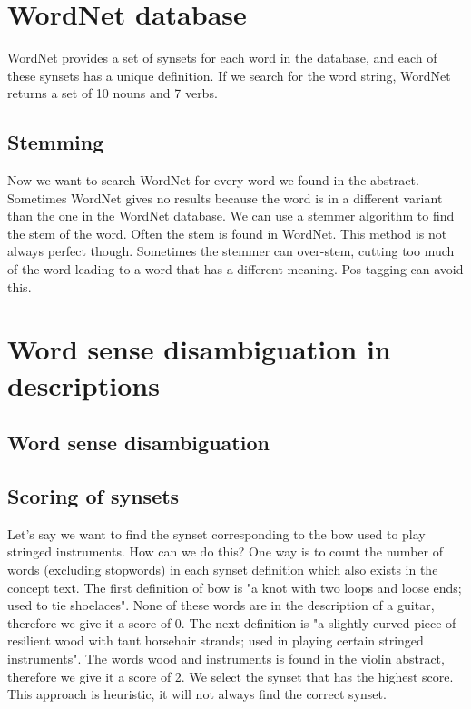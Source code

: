 
\section{WordNet database}
WordNet provides a set of synsets for each word in the database, and each of these synsets has a unique definition. If we search for the word string, WordNet returns a set of 10 nouns and 7 verbs. %

\subsection{Stemming}
Now we want to search WordNet for every word we found in the abstract. Sometimes WordNet gives no results because the word is in a different variant than the one in the WordNet database. We can use a stemmer algorithm to find the stem of the word. Often the stem is found in WordNet. This method is not always perfect though. Sometimes the stemmer can over-stem, cutting too much of the word leading to a word that has a different meaning. %
Pos tagging can avoid this.


\section{Word sense disambiguation in descriptions}
\subsection{Word sense disambiguation}
\subsection{Scoring of synsets}
Let's say we want to find the synset corresponding to the bow used to play stringed instruments. How can we do this? One way is to count the number of words (excluding stopwords) in each synset definition which also exists in the concept text. The first definition of bow is "a knot with two loops and loose ends; used to tie shoelaces". None of these words are in the description of a guitar, therefore we give it a score of 0. The next definition is "a slightly curved piece of resilient wood with taut horsehair strands; used in playing certain stringed instruments". The words wood and instruments is found in the violin abstract, therefore we give it a score of 2. We select the synset that has the highest score. This approach is heuristic, it will not always find the correct synset.


